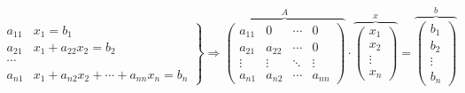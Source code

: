 \begin{equation*}
\left. \begin{aligned}
a_{11}&x_1=b_1\\
a_{21}&x_1+a_{22}x_2=b_2\\
\cdots & \\
a_{n1}&x_1+a_{n2}x_2+\cdots +a_{nn}x_n=b_n
\end{aligned}\right\} \Rightarrow	\overbrace{\begin{pmatrix}
a_{11}& 0& \cdots & 0\\
a_{21}& a_{22}& \cdots & 0\\
\vdots & \vdots & \ddots & \vdots\\
a_{n1}& a_{n2}& \cdots & a_{nn}
\end{pmatrix}}^A \cdot \overbrace{\begin{pmatrix}
x_1\\
x_2\\
\vdots \\
x_n
\end{pmatrix}}^x=\overbrace{\begin{pmatrix}
b_1\\
b_2\\
\vdots \\
b_n
\end{pmatrix}}^b
\end{equation*}

